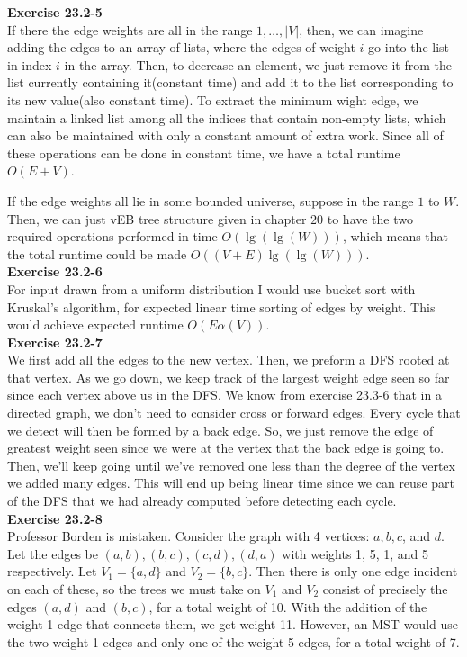 \documentclass{article}
\begin{document}
\noindent\textbf{Exercise 23.2-5}\\

If there the edge weights are all in the range $1,\ldots, |V|$, then, we can imagine adding the edges to an array of lists, where the edges of weight $i$ go into the list in index $i$ in the array. Then, to decrease an element, we just remove it from the list currently containing it(constant time) and add it to the list corresponding to its new value(also constant time). To extract the minimum wight edge, we maintain a linked list among all the indices that contain non-empty lists, which can also be maintained with only a constant amount of extra work. Since all of these operations can be done in constant time, we have a total runtime $O(E+V)$.

If the edge weights all lie in some bounded universe, suppose in the range $1$ to $W$. Then, we can just vEB tree structure given in chapter $20$ to have the two required operations performed in time $O(\lg(\lg(W)))$, which means that the total runtime could be made $O((V+E)\lg(\lg(W)))$.\\

\noindent\textbf{Exercise 23.2-6}\\

For input drawn from a uniform distribution I would use bucket sort with Kruskal's algorithm, for expected linear time sorting of edges by weight.  This would achieve expected runtime $O(E\alpha(V))$. \\

\noindent\textbf{Exercise 23.2-7}\\
We first add all the edges to the new vertex. Then, we preform a DFS rooted at that vertex. As we go down, we keep track of the largest weight edge seen so far since each vertex above us in the DFS. We know from exercise 23.3-6 that in a directed graph, we don't need to consider cross or forward edges. Every cycle that we detect will then be formed by a back edge. So, we just remove the edge of greatest weight seen since we were at the vertex that the back edge is going to. Then, we'll keep going until we've removed one less than the degree of the vertex we added many edges. This will end up being linear time since we can reuse part of the DFS that we had already computed before detecting each cycle.\\

\noindent\textbf{Exercise 23.2-8}\\

Professor Borden is mistaken.  Consider the graph with 4 vertices: $a, b, c$, and $d$.  Let the edges be $(a,b), (b,c), (c,d), (d,a)$ with weights 1, 5, 1, and 5 respectively.  Let $V_1 = \{a,d\}$ and $V_2 = \{b,c\}$.  Then there is only one edge incident on each of these, so the trees we must take on $V_1$ and $V_2$ consist of precisely the edges $(a,d)$ and $(b,c)$, for a total weight of 10.  With the addition of the weight 1 edge that connects them, we get weight 11.  However, an MST would use the two weight 1 edges and only one of the weight 5 edges, for a total weight of 7. \\
\end{document}
